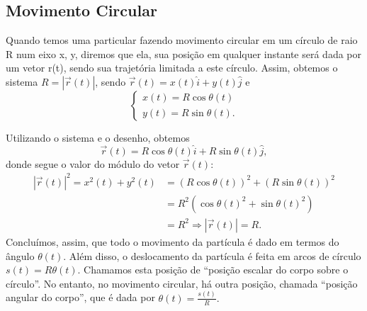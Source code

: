 \documentclass{article}
\begin{document}
\subsection{Movimento Circular}
  Quando temos uma particular fazendo movimento circular em um c\'irculo de raio R num eixo x, y, diremos que ela, sua posi\c c\~ao em qualquer instante
ser\'a dada por um vetor r(t), sendo sua trajet\'oria limitada a este c\'irculo. Assim, obtemos o sistema $R = |\vec{r}(t)|$, sendo 
$\vec{r}(t) = x(t)\hat{i} + y(t)\hat{j}$ e 
  $$
     \left\{\begin{array}{ll}
         x(t) = R\cos{\theta(t)}\\
         y(t) = R\sin{\theta(t)}.
      \end{array}\right.
  $$
  \begin{center}
  \end{center}
  Utilizando o sistema e o desenho, obtemos 
    $$
    \vec{r}(t) = R\cos{\theta(t)}\hat{i} + R\sin{\theta(t)}\hat{j},
    $$
    donde segue o valor do m\'odulo do vetor $\vec{r}(t)$:
   \begin{align*}
     |\vec{r}(t)|^{2} = x^{2}(t) + y^{2}(t) &= (R\cos{\theta(t)})^{2} + (R\sin{\theta(t)})^{2} \\
                                            &= R^{2}(\cos{\theta(t)}^{2} + \sin{\theta(t)}^{2}) \\
                                            &= R^{2} \Rightarrow |\vec{r}(t)| = R.
   \end{align*}
   Conclu\'imos, assim, que todo o movimento da part\'icula \'e dado em termos do \^angulo $\theta(t).$ Al\'em disso, o deslocamento
  da part\'icula \'e feita em arcos de c\'irculo $s(t) = R\theta(t)$. Chamamos esta posi\c c\~ao de ``posi\c c\~ao escalar do corpo sobre o c\'irculo''.
  No entanto, no movimento circular, h\'a outra posi\c c\~ao, chamada ``posi\c c\~ao angular do corpo'', que \'e dada por $\theta(t) = \frac{s(t)}{R}.$
  
\end{document}
